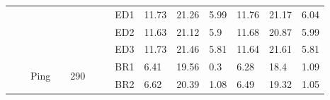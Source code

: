 {\begin{minipage}{\linewidth}
\begin{tabular}{l|l|l|l|c|c|r|l|lll|lll}
                                              &                                          &                                           &                                           &                                            &                                                                                         & \multicolumn{1}{c|}{}                                                                          & ED1                                       & 11.73 & 21.26 & 5.99      & 11.76 & 21.17 & 6.04       \\
                                              &                                          &                                           &                                           &                                            &                                                                                         & \multicolumn{1}{c|}{}                                                                          & ED2                                       & 11.63 & 21.12 & 5.9       & 11.68 & 20.87 & 5.99       \\
                                              &                                          &                                           &                                           &                                            &                                                                                         & \multicolumn{1}{c|}{}                                                                          & ED3                                       & 11.73 & 21.46 & 5.81      & 11.64 & 21.61 & 5.81       \\
  \cline{3-3}\cline{5-5}\cline{8-14}
                                              &                                          & \multirow{8}{*}{Ping}                     &                                           & \multicolumn{1}{l|}{\multirow{8}{*}{290}}  &                                                                                         & \multicolumn{1}{c|}{}                                                                          & BR1                                       & 6.41  & 19.56 & 0.3       & 6.28  & 18.4  & 1.09       \\
                                              &                                          &                                           &                                           & \multicolumn{1}{l|}{}                      &                                                                                         & \multicolumn{1}{c|}{}                                                                          & BR2                                       & 6.62  & 20.39 & 1.08      & 6.49  & 19.32 & 1.05       \\

\end{tabular}
\end{minipage}}
